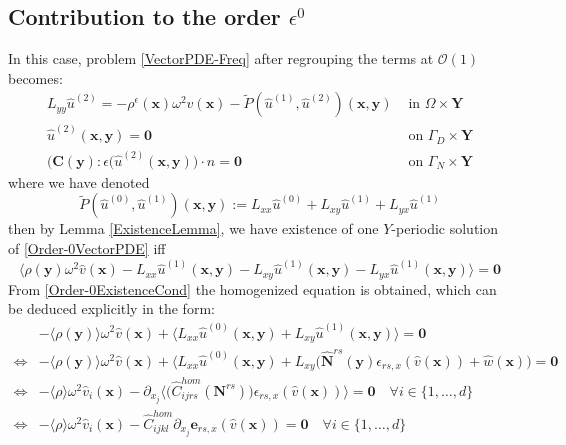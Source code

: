 \subsection{Contribution to the order $\epsilon^{0}$}
In this case, problem \ref{VectorPDE-Freq} after regrouping the terms at $\mathcal{O}(1)$ becomes:
\begin{equation}
    \label{Order-0VectorPDE}
    \begin{array}{cc}
        L_{yy} \hat{u}^{(2)} =-\rho^{\epsilon}(\mathbf{x})\omega^2 \hat{v}(\mathbf{x}) - \tilde{P}(\hat{u}^{(1)},\hat{u}^{(2)}) (\mathbf{x},\mathbf{y}) & \text{ in } \Omega \times \mathbf{Y} \\
        \hat{u}^{(2)}(\mathbf{x},\mathbf{y}) = \mathbf{0} & \text{ on } \Gamma_D \times \mathbf{Y} \\
        \big( \mathbf{C}(\mathbf{y}) : \epsilon(\hat{u}^{(2)}(\mathbf{x},\mathbf{y}) \big) \cdot n = \mathbf{0} & \text{ on } \Gamma_N\times \mathbf{Y}
    \end{array}
\end{equation}
where we have denoted 
\begin{equation*}
    \tilde{P}(\hat{u}^{(0)}, \hat{u}^{(1)}) (\mathbf{x},\mathbf{y}) :=  L_{xx} \hat{u}^{(0)} + L_{xy} \hat{u}^{(1)} + L_{yx} \hat{u}^{(1)}
\end{equation*}
then by Lemma \ref{ExistenceLemma}, we have existence of one $Y$-periodic solution of \ref{Order-0VectorPDE} iff 
\begin{equation}
    \label{Order-0ExistenceCond}
    \big \langle \rho(\mathbf{y}) \omega^2 \hat{v}(\mathbf{x}) - L_{xx} \hat{u}^{(1)} (\mathbf{x},\mathbf{y}) - L_{xy} \hat{u}^{(1)}(\mathbf{x},\mathbf{y}) - L_{yx}\hat{u}^{(1)}(\mathbf{x},\mathbf{y}) \big \rangle = \mathbf{0}
\end{equation}
From \ref{Order-0ExistenceCond} the homogenized equation is obtained, which can be deduced explicitly in the form:
\begin{align*}
    &-\langle \rho(\mathbf{y}) \rangle \omega^2 \hat{v}(\mathbf{x}) + \langle L_{xx} \hat{u}^{(0)}(\mathbf{x},\mathbf{y}) +L_{xy} \hat{u}^{(1)}(\mathbf{x},\mathbf{y}) \rangle = \mathbf{0} \\
    \Leftrightarrow & -\langle \rho(\mathbf{y}) \rangle \omega^2 \hat{v}(\mathbf{x}) + \langle L_{xx}\hat{u}^{(0)}(\mathbf{x}, \mathbf{y}) + L_{xy}\big( \hat{\mathbf{N}}^{rs}(\mathbf{y})\epsilon_{rs,x}(\hat{v}(\mathbf{x})) + \hat{w}(\mathbf{x})\big) = \mathbf{0} \\
    \Leftrightarrow & -\langle \rho\rangle \omega^2 \hat{v}_i(\mathbf{x}) - \partial_{x_j}\big \langle \big(\hat{C}_{ijrs}^{hom}(\mathbf{N}^{rs})\big) \epsilon_{rs,x}(\hat{v}(\mathbf{x})) \big \rangle  = \mathbf{0} \quad \forall i \in \{1,\dots, d\}\\
    \Leftrightarrow& -\langle \rho \rangle \omega^2 \hat{v}_i(\mathbf{x}) - \hat{C}_{ijkl}^{hom} \partial_{x_j} \mathbf{e}_{rs,x} (\hat{v}(\mathbf{x})) = \mathbf{0} \quad \forall i \in \{1,\dots,d\}
\end{align*}
